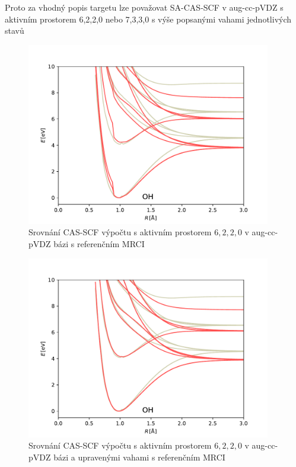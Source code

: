 Proto za vhodný popis targetu lze považovat SA-CAS-SCF v aug-cc-pVDZ s aktivním 
prostorem 6,2,2,0 nebo 7,3,3,0 s výše popsanými vahami jednotlivých stavů

\begin{figure}
\centering
\includegraphics[width=0.95\textwidth]{../img/OH-MULTI-DZ-6220.pdf}
\caption{Srovnání CAS-SCF výpočtu s aktivním prostorem $6,2,2,0$ v aug-cc-pVDZ bázi 
s referenčním MRCI}
\label{gr_OH_6220}
\end{figure}

\begin{figure}
\centering
\includegraphics[width=0.95\textwidth]{../img/OH-MULTI-DZ-6220-w8.pdf}
\caption{Srovnání CAS-SCF výpočtu s aktivním prostorem $6,2,2,0$ v aug-cc-pVDZ bázi a upravenými vahami s referenčním MRCI}
\label{gr_OH_6220_w}
\end{figure}

